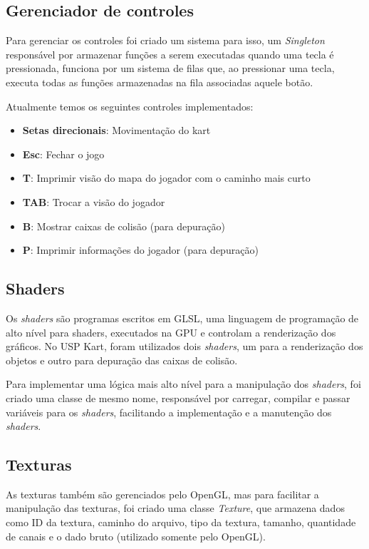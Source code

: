 \subsection{Gerenciador de controles}\label{sec:gerenciador-de-controles}

Para gerenciar os controles foi criado um sistema para isso, um \textit{Singleton} responsável por armazenar funções a serem executadas quando uma tecla é pressionada, funciona por um sistema de filas que, ao pressionar uma tecla, executa todas as funções armazenadas na fila associadas aquele botão.

Atualmente temos os seguintes controles implementados:

\begin{itemize}
    \item \textbf{Setas direcionais}: Movimentação do kart
    \item \textbf{Esc}: Fechar o jogo
    \item \textbf{T}: Imprimir visão do mapa do jogador com o caminho mais curto
    \item \textbf{TAB}: Trocar a visão do jogador
    \item \textbf{B}: Mostrar caixas de colisão (para depuração)
    \item \textbf{P}: Imprimir informações do jogador (para depuração)
\end{itemize}

\subsection{Shaders}

Os \textit{shaders} são programas escritos em GLSL, uma linguagem de programação de alto nível para shaders, executados na GPU e controlam a renderização dos gráficos. No USP Kart, foram utilizados dois \textit{shaders}, um para a renderização dos objetos e outro para depuração das caixas de colisão.

Para implementar uma lógica mais alto nível para a manipulação dos \textit{shaders}, foi criado uma classe de mesmo nome, responsável por carregar, compilar e passar variáveis para os \textit{shaders}, facilitando a implementação e a manutenção dos \textit{shaders}.

\subsection{Texturas}

As texturas também são gerenciados pelo OpenGL, mas para facilitar a manipulação das texturas, foi criado uma classe \textit{Texture}, que armazena dados como ID da textura, caminho do arquivo, tipo da textura, tamanho, quantidade de canais e o dado bruto (utilizado somente pelo OpenGL).

